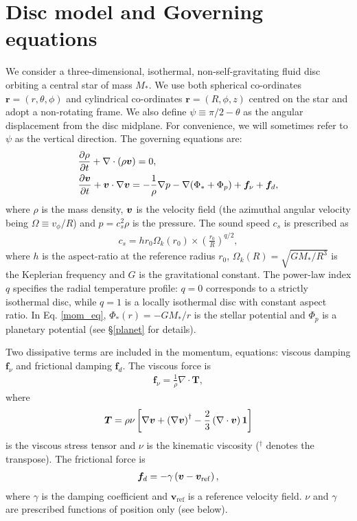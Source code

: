 \section{Disc model and Governing equations}\label{model} 
We consider a three-dimensional, isothermal,
non-self-gravitating fluid disc orbiting a central 
star of mass $M_*$. We use both spherical co-ordinates
$\bm{r}=(r,\theta,\phi)$ and cylindrical co-ordinates  
$\bm{r}=(R, \phi, z)$ centred on the star and 
adopt a non-rotating frame. We also define $\psi \equiv \pi/2 -
\theta$ as the angular displacement from the disc midplane. For
convenience, we will sometimes refer to $\psi$ as the vertical
direction. The governing equations are: 
\begin{align}
  &\frac{\partial\rho}{\partial t} + \nabla\cdot\left(\rho\bm{v}\right) =
  0,\label{cont_eq}\\ 
  &\frac{\partial\bm{v}}{\partial t} + \bm{v}\cdot\nabla\bm{v} = -\frac{1}{\rho}\nabla
  p -\nabla{\left(\Phi_*+\Phi_p\right)} +\bm{f}_\nu + \bm{f}_d\label{mom_eq},    
\end{align}
where $\rho$ is the mass density, $\bm{v}$ is the velocity field (the
azimuthal angular velocity being $\Omega\equiv v_\phi/R$) and 
$p=c_s^2\rho$ is the pressure. 
The sound speed $c_s$ is prescribed as 
\begin{align}
  c_s = hr_0\Omega_k(r_0)\times\left(\frac{r_0}{R}\right)^{q/2}, 
\end{align}
where $h$ is the aspect-ratio at the reference radius $r_0$, 
$\Omega_k(R) = \sqrt{GM_*/R^3}$ is the Keplerian frequency and $G$ is
the gravitational constant. The power-law index $q$ specifies the
radial temperature profile: $q=0$ corresponds to a strictly isothermal
disc, while $q=1$ is a locally isothermal disc with constant aspect
ratio. In Eq. \ref{mom_eq}, $\Phi_*(r) = -GM_*/r $ is the stellar
potential and $\Phi_p$ is a planetary potential (see \S\ref{planet}
for details).  

Two dissipative terms are included in the momentum, equations: viscous
damping $\bm{f}_\nu$ and frictional damping $\bm{f}_d$. The viscous
force is 
\begin{align}
  \bm{f}_\nu = \frac{1}{\rho}\nabla\cdot\bm{T},
\end{align}
where 
\begin{align}
  \bm{T} = \rho\nu \left[\nabla\bm{v} + \left(\nabla\bm{v}\right)^\dagger
    - \frac{2}{3}\left(\nabla\cdot\bm{v}\right)\bm{1} \right]
\end{align}
is the viscous stress tensor and $\nu$ is the kinematic viscosity 
($^\dagger$ denotes the transpose). The frictional force is 
\begin{align}
  \bm{f}_d = -\gamma\left(\bm{v} - \bm{v}_\mathrm{ref}\right),
\end{align}
where $\gamma$ is the damping coefficient and
$\bm{v}_\mathrm{ref}$ is a reference velocity field. 
$\nu$ and $\gamma$ are prescribed functions of position only (see
below). %

